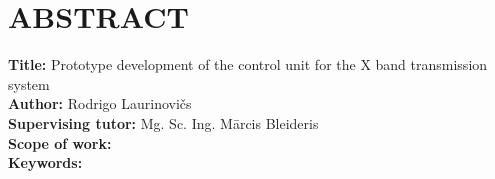 \chapter*{ABSTRACT}
\begin{flushleft}
\textbf{Title:} Prototype development of the control unit for the X band transmission system\\
\textbf{Author:} Rodrigo Laurinovičs\\
\textbf{Supervising tutor:} Mg. Sc. Ing. Mārcis Bleideris\\
\textbf{Scope of work:}  \\
\textbf{Keywords:} 
\end{flushleft}
